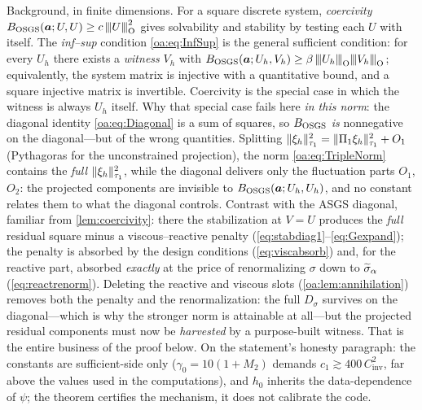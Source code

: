 \begin{pedagogy}
Background, in finite dimensions. For a square discrete system,
\emph{coercivity} $B_{\mathrm{OSGS}}(\boldsymbol{a};U,U) \ge c\,{\lvert\kern-0.25ex\lvert\kern-0.25ex\lvert U \rvert\kern-0.25ex\rvert\kern-0.25ex\rvert}_{\mathrm O}^2$ gives solvability and stability by
testing each $U$ with itself. The \emph{inf--sup} condition \cref{oa:eq:InfSup}
is the general sufficient condition: for every $U_h$ there exists a
\emph{witness} $V_h$ with $B_{\mathrm{OSGS}}(\boldsymbol{a};U_h,V_h) \ge \beta\,{\lvert\kern-0.25ex\lvert\kern-0.25ex\lvert U_h \rvert\kern-0.25ex\rvert\kern-0.25ex\rvert}_{\mathrm
O}{\lvert\kern-0.25ex\lvert\kern-0.25ex\lvert V_h \rvert\kern-0.25ex\rvert\kern-0.25ex\rvert}_{\mathrm O}$; equivalently, the system matrix is injective with a
quantitative bound, and a square injective matrix is invertible. Coercivity is
the special case in which the witness is always $U_h$ itself. Why that special
case fails here \emph{in this norm}: the diagonal identity \cref{oa:eq:Diagonal}
is a sum of squares, so $B_{\mathrm{OSGS}}$ \emph{is} nonnegative on the
diagonal---but of the wrong quantities. Splitting $\lVert \xi_h \rVert_{\tau_1}^2 =
\lVert \Pi_{1}\xi_h \rVert_{\tau_1}^2 + O_1$ (Pythagoras for the unconstrained
projection), the norm \cref{oa:eq:TripleNorm} contains the \emph{full}
$\lVert \xi_h \rVert_{\tau_1}^2$, while the diagonal delivers only the fluctuation
parts $O_1$, $O_2$: the projected components are invisible to
$B_{\mathrm{OSGS}}(\boldsymbol{a};U_h,U_h)$, and no constant relates them to what the diagonal
controls. Contrast with the ASGS diagonal, familiar from \cref{lem:coercivity}:
there the stabilization at $V=U$ produces the \emph{full} residual square minus
a viscous--reactive penalty (\cref{eq:stabdiag1}--\cref{eq:Gexpand}); the
penalty is absorbed by the design conditions (\cref{eq:viscabsorb}) and, for
the reactive part, absorbed \emph{exactly} at the price of renormalizing
$\sigma$ down to $\widetilde{\sigma}_{\alpha}$ (\cref{eq:reactrenorm}). Deleting the reactive
and viscous slots (\cref{oa:lem:annihilation}) removes both the penalty and the
renormalization: the full $D_\sigma$ survives on the diagonal---which is why the
stronger norm is attainable at all---but the projected residual components must
now be \emph{harvested} by a purpose-built witness. That is the entire business
of the proof below. On the statement's honesty paragraph: the constants are
sufficient-side only ($\gamma_0 = 10(1+M_2)$ demands $c_1 \gtrsim
400\,C_{\mathrm{inv}}^2$, far above the values used in the computations), and
$h_0$ inherits the data-dependence of $\psi$; the theorem certifies the
mechanism, it does not calibrate the code.
\end{pedagogy}

